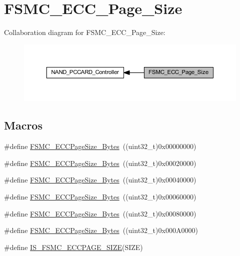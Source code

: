 \hypertarget{group___f_s_m_c___e_c_c___page___size}{}\section{F\+S\+M\+C\+\_\+\+E\+C\+C\+\_\+\+Page\+\_\+\+Size}
\label{group___f_s_m_c___e_c_c___page___size}
Collaboration diagram for F\+S\+M\+C\+\_\+\+E\+C\+C\+\_\+\+Page\+\_\+\+Size\+:
\nopagebreak
\begin{figure}[H]
\begin{center}
\leavevmode
\includegraphics[width=350pt]{group___f_s_m_c___e_c_c___page___size}
\end{center}
\end{figure}
\subsection*{Macros}
\begin{DoxyCompactItemize}
\item 
\#define \hyperlink{group___f_s_m_c___e_c_c___page___size_gaaa1661267b44e6728fa64aca79de54b3}{F\+S\+M\+C\+\_\+\+E\+C\+C\+Page\+Size\+\_\+Bytes}~((uint32\+\_\+t)0x00000000)
\item 
\#define \hyperlink{group___f_s_m_c___e_c_c___page___size_gacb4da17c28dde89e38ff4ed40497f6b5}{F\+S\+M\+C\+\_\+\+E\+C\+C\+Page\+Size\+\_\+Bytes}~((uint32\+\_\+t)0x00020000)
\item 
\#define \hyperlink{group___f_s_m_c___e_c_c___page___size_ga8137931c96b63ec7e6f80a8c7391433f}{F\+S\+M\+C\+\_\+\+E\+C\+C\+Page\+Size\+\_\+Bytes}~((uint32\+\_\+t)0x00040000)
\item 
\#define \hyperlink{group___f_s_m_c___e_c_c___page___size_gab8f3ae95becd59e71a976b97ded904b8}{F\+S\+M\+C\+\_\+\+E\+C\+C\+Page\+Size\+\_\+Bytes}~((uint32\+\_\+t)0x00060000)
\item 
\#define \hyperlink{group___f_s_m_c___e_c_c___page___size_gaec2e9e434685a1756bd171699248f65a}{F\+S\+M\+C\+\_\+\+E\+C\+C\+Page\+Size\+\_\+Bytes}~((uint32\+\_\+t)0x00080000)
\item 
\#define \hyperlink{group___f_s_m_c___e_c_c___page___size_gab6877a99ddf02e7aa95cf04896ce731d}{F\+S\+M\+C\+\_\+\+E\+C\+C\+Page\+Size\+\_\+Bytes}~((uint32\+\_\+t)0x000\+A0000)
\item 
\#define \hyperlink{group___f_s_m_c___e_c_c___page___size_ga58fefa0d55875775a88f54ad7498178f}{I\+S\+\_\+\+F\+S\+M\+C\+\_\+\+E\+C\+C\+P\+A\+G\+E\+\_\+\+S\+I\+ZE}(S\+I\+ZE)
\end{DoxyCompactItemize}


